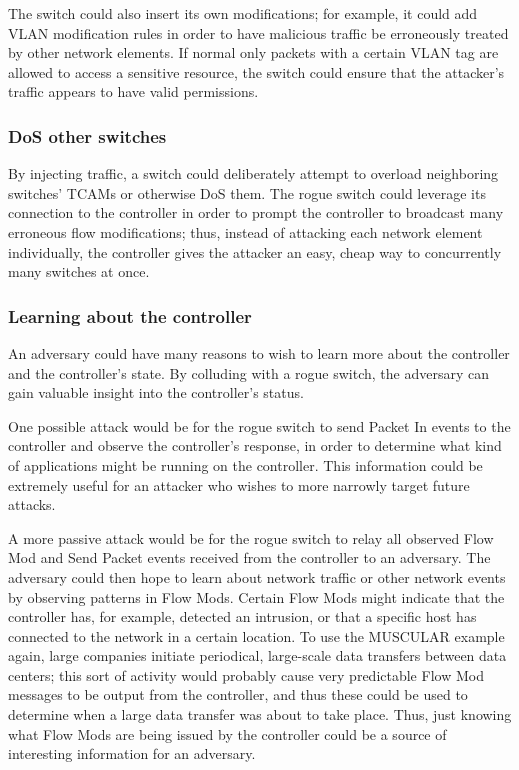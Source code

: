The switch could also insert its own modifications; for example, it could add VLAN modification rules in order to have malicious traffic be erroneously treated by other network elements. If normal only packets with a certain VLAN tag are allowed to access a sensitive resource, the switch could ensure that the attacker's traffic appears to have valid permissions.

\subsubsection{DoS other switches}
By injecting traffic, a switch could deliberately attempt to overload neighboring switches' TCAMs or otherwise DoS them. The rogue switch could leverage its connection to the controller in order to prompt the controller to broadcast many erroneous flow modifications; thus, instead of attacking each network element individually, the controller gives the attacker an easy, cheap way to concurrently many switches at once. 

\subsubsection{Learning about the controller}
An adversary could have many reasons to wish to learn more about the controller and the controller's state. By colluding with a rogue switch, the adversary can gain valuable insight into the controller's status.

One possible attack would be for the rogue switch to send Packet In events to the controller and observe the controller's response, in order to determine what kind of applications might be running on the controller. This information could be extremely useful for an attacker who wishes to more narrowly target future attacks.

A more passive attack would be for the rogue switch to relay all observed Flow Mod and Send Packet events received from the controller to an adversary. The adversary could then hope to learn about network traffic or other network events by observing patterns in Flow Mods. Certain Flow Mods might indicate that the controller has, for example, detected an intrusion, or that a specific host has connected to the network in a certain location. To use the MUSCULAR example again, large companies initiate periodical, large-scale data transfers between data centers; this sort of activity would probably cause very predictable Flow Mod messages to be output from the controller, and thus these could be used to determine when a large data transfer was about to take place. Thus, just knowing what Flow Mods are being issued by the controller could be a source of interesting information for an adversary.


